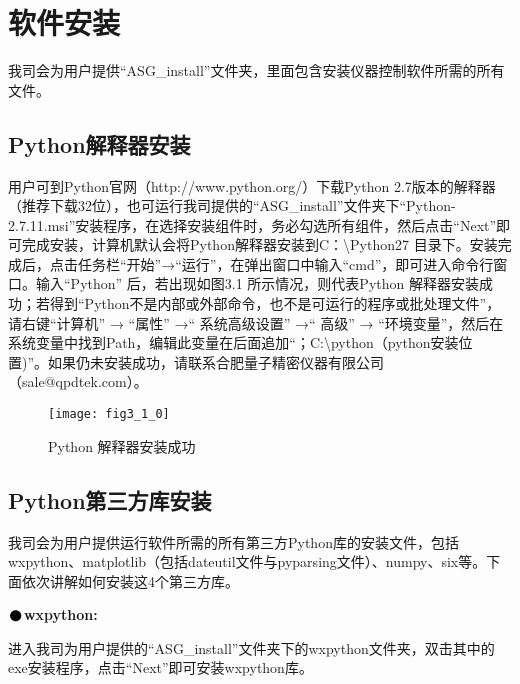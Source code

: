 \pagestyle{fancy}
\chapter{\heiti 软件安装}
\setmainfont{Times New Roman}

我司会为用户提供“ASG\_install”文件夹，里面包含安装仪器控制软件所需的所有文件。

\section{Python\heiti 解释器安装}
用户可到Python官网（http://www.python.org/）下载Python 2.7版本的解释器（推荐下载32位），也可运行我司提供的“ASG\_install”文件夹下“Python-2.7.11.msi”安装程序，在选择安装组件时，务必勾选所有组件，然后点击“Next”即可完成安装，计算机默认会将Python解释器安装到C：\textbackslash Python27 目录下。安装完成后，点击任务栏“开始”→“运行”，在弹出窗口中输入“cmd”，即可进入命令行窗口。输入“Python” 后，若出现如图3.1 所示情况，则代表Python 解释器安装成功；若得到“Python不是内部或外部命令，也不是可运行的程序或批处理文件”，请右键“计算机” → “属性” →“ 系统高级设置” →“ 高级” → “环境变量”，然后在系统变量中找到Path，编辑此变量在后面追加“；C:\textbackslash python（python安装位置)”。如果仍未安装成功，请联系合肥量子精密仪器有限公司（sale@qpdtek.com）。
\begin{figure}[ht]
\centering
\texttt{[image: fig3\_1\_0]}
\caption{Python 解释器安装成功}
\end{figure}

\newpage
\section{Python\heiti 第三方库安装}
我司会为用户提供运行软件所需的所有第三方Python库的安装文件，包括wxpython、matplotlib（包括dateutil文件与pyparsing文件）、numpy、six等。下面依次讲解如何安装这4个第三方库。
\vspace{0.3cm}

\noindent$\vcenter{\hbox{\huge$\bullet$}}$\quad\fontsize{12pt}{\baselineskip}\textbf{wxpython:}

进入我司为用户提供的“ASG\_install”文件夹下的wxpython文件夹，双击其中的exe安装程序，点击“Next”即可安装wxpython库。
\vspace{0.3cm}


